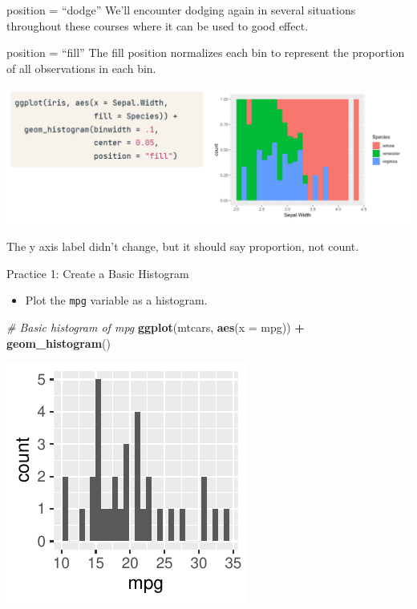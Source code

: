 \documentclass[
  ignorenonframetext,
]{beamer}
\newenvironment{Shaded}{\begin{snugshade}}{\end{snugshade}}
\newcommand{\AttributeTok}[1]{\textcolor[rgb]{0.13,0.29,0.53}{#1}}
\newcommand{\CommentTok}[1]{\textcolor[rgb]{0.56,0.35,0.01}{\textit{#1}}}
\newcommand{\FunctionTok}[1]{\textcolor[rgb]{0.13,0.29,0.53}{\textbf{#1}}}
\newcommand{\NormalTok}[1]{#1}
\newcommand{\SpecialCharTok}[1]{\textcolor[rgb]{0.81,0.36,0.00}{\textbf{#1}}}
\providecommand{\tightlist}{%
  \setlength{\itemsep}{0pt}\setlength{\parskip}{0pt}}
\begin{document}
\begin{frame}{position = ``dodge''}
\label{position-dodge-1}
We'll encounter dodging again in several situations throughout these
courses where it can be used to good effect.
\end{frame}

\begin{frame}{position = ``fill''}
\label{position-fill}
The fill position normalizes each bin to represent the proportion of all
observations in each bin.

\includegraphics{../images/im206.png}

The y axis label didn't change, but it should say proportion, not count.
\end{frame}

\begin{frame}[fragile]{Practice 1: Create a Basic Histogram}
\label{practice-1-create-a-basic-histogram}
\begin{itemize}
\tightlist
\item
  Plot the \texttt{mpg} variable as a histogram.
\end{itemize}


\begin{Shaded}
\begin{Highlighting}[]
\CommentTok{\# Basic histogram of mpg}
\FunctionTok{ggplot}\NormalTok{(mtcars, }\FunctionTok{aes}\NormalTok{(}\AttributeTok{x =}\NormalTok{ mpg)) }\SpecialCharTok{+} \FunctionTok{geom\_histogram}\NormalTok{()}
\end{Highlighting}
\end{Shaded}

\begin{center}\includegraphics[width=0.5\linewidth]{Figs/unnamed-chunk-37-1} \end{center}
\end{frame}
\end{document}
